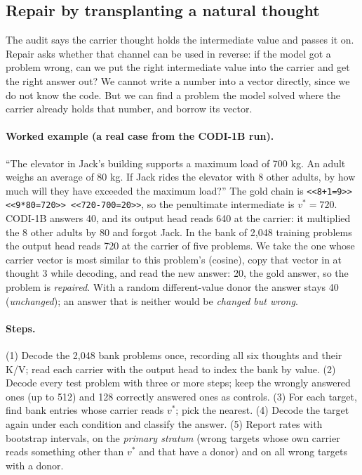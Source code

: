 \documentclass{article}
\begin{document}
\subsection{Repair by transplanting a natural thought}\label{sec:repair-method}

The audit says the carrier thought holds the intermediate value and passes it on. Repair asks whether that channel can be used in reverse: if the model got a problem wrong, can we put the right intermediate value into the carrier and get the right answer out? We cannot write a number into a vector directly, since we do not know the code. But we can find a problem the model solved where the carrier already holds that number, and borrow its vector.

\paragraph{Worked example (a real case from the CODI-1B run).} ``The elevator in Jack's building supports a maximum load of 700 kg. An adult weighs an average of 80 kg. If Jack rides the elevator with 8 other adults, by how much will they have exceeded the maximum load?'' The gold chain is \texttt{<<8+1=9>> <<9*80=720>> <<720-700=20>>}, so the penultimate intermediate is $v^*=720$. CODI-1B answers 40, and its output head reads 640 at the carrier: it multiplied the 8 other adults by 80 and forgot Jack. In the bank of 2{,}048 training problems the output head reads 720 at the carrier of five problems. We take the one whose carrier vector is most similar to this problem's (cosine), copy that vector in at thought 3 while decoding, and read the new answer: 20, the gold answer, so the problem is \emph{repaired}. With a random different-value donor the answer stays 40 (\emph{unchanged}); an answer that is neither would be \emph{changed but wrong}.

\paragraph{Steps.} (1) Decode the 2{,}048 bank problems once, recording all six thoughts and their K/V; read each carrier with the output head to index the bank by value. (2) Decode every test problem with three or more steps; keep the wrongly answered ones (up to 512) and 128 correctly answered ones as controls. (3) For each target, find bank entries whose carrier reads $v^*$; pick the nearest. (4) Decode the target again under each condition and classify the answer. (5) Report rates with bootstrap intervals, on the \emph{primary stratum} (wrong targets whose own carrier reads something other than $v^*$ and that have a donor) and on all wrong targets with a donor.
\end{document}
